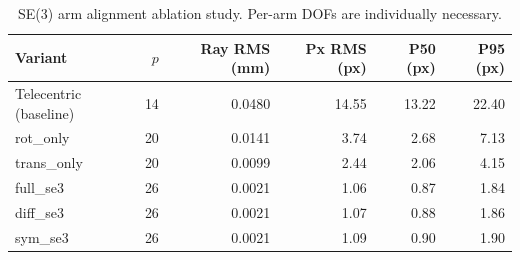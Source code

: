 \begin{table}[H]
\centering
\caption{SE(3) arm alignment ablation study. Per-arm DOFs are individually necessary.}
\label{tab:ablation}
\begin{tabular}{lrrrrr}
\toprule
Variant & $p$ & Ray RMS (mm) & Px RMS (px) & P50 (px) & P95 (px) \\
\midrule
Telecentric (baseline) & 14 & 0.0480 & 14.55 & 13.22 & 22.40 \\
rot_only & 20 & 0.0141 & 3.74 & 2.68 & 7.13 \\
trans_only & 20 & 0.0099 & 2.44 & 2.06 & 4.15 \\
full_se3 & 26 & 0.0021 & 1.06 & 0.87 & 1.84 \\
diff_se3 & 26 & 0.0021 & 1.07 & 0.88 & 1.86 \\
sym_se3 & 26 & 0.0021 & 1.09 & 0.90 & 1.90 \\
\bottomrule
\end{tabular}
\end{table}
